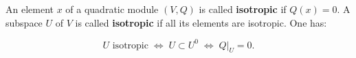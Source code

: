 An element $x$ of a quadratic module $(V,Q)$ is called \textbf{isotropic} if $Q(x) = 0$. A subspace $U$ of $V$ is called \textbf{isotropic} if all its elements are isotropic. One has:

$$U \text{ isotropic} \;\Longleftrightarrow\; U \subset U^0 \;\Longleftrightarrow\; Q|_U = 0.$$

